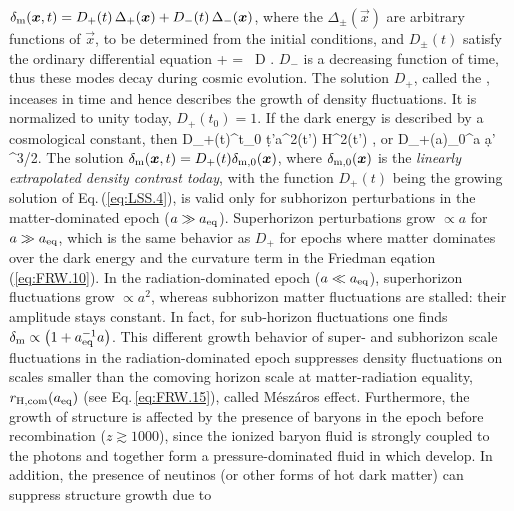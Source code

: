 {$\delta_{\rm m}(\vec x,t)=D_+(t)\,\Delta_+(\vec x)+D_-(t)\,\Delta_-(\vec x)$,
where the $\Delta_\pm(\vec x)$ are arbitrary functions of $\vec x$, to be
determined from the initial conditions, and 
$D_\pm(t)$ satisfy the ordinary differential equation
%
\be
{} +   = \, D \;.
\label{eq:LSS.4}
\ee
%
$D_-$ is a decreasing function of time, thus these modes decay during
cosmic evolution. The solution $D_+$, called the , 
inceases in time and hence 
describes the growth of density fluctuations. It is normalized to
unity today, $D_+(t_0)=1$. If the dark energy is described by a
cosmological constant, then
%
\be
D_+(t)\int^t_0 {\d t'\over a^2(t') H^2(t')} \;,\quad
\hbox{or}\quad
D_+(a)\int_0^a {\d a' \over {}^{3/2}}\;.
\label{eq:LSS.5}
\ee
%
The solution $\delta_{\rm m}(\vec x,t)=D_+(t)\delta_{\rm m,0}(\vec
x)$, where $\delta_{\rm m,0}(\vec x)$ is the {\it linearly
  extrapolated density contrast today}, with the function $D_+(t)$
being the growing solution of Eq.\,(\ref{eq:LSS.4}), is valid only for
subhorizon perturbations in
the matter-dominated epoch ($a\gg a_{\rm eq}$). Superhorizon
perturbations grow $\propto a$ for $a\gg a_{\rm eq}$, which is the same
behavior as $D_+$ for epochs where matter dominates over the dark
energy and the curvature term in the Friedman eqation (\ref{eq:FRW.10}).
In the radiation-dominated epoch ($a\ll a_{\rm eq}$), superhorizon
fluctuations grow $\propto a^2$, whereas subhorizon matter
fluctuations are stalled: their amplitude stays constant. In fact, for
sub-horizon fluctuations one finds $\delta_{\rm m}\propto
\rund{1+a_{\rm eq}^{-1}a}$. This different growth behavior of super-
and subhorizon scale fluctuations in the radiation-dominated epoch
suppresses density fluctuations on scales smaller than  the comoving
horizon scale at matter-radiation 
equality, $r_{\rm H,com}(a_{\rm eq})$ (see Eq.\,\ref{eq:FRW.15}), called
M\'esz\'aros effect. Furthermore, the
growth of structure is affected by the presence of baryons in the epoch
before recombination ($z\gtrsim 1000$), since the ionized baryon fluid
is strongly coupled to the photons and together form a
pressure-dominated fluid in which  develop. In
addition, the presence of neutinos (or other forms of hot dark matter) can suppress structure growth due to
}
